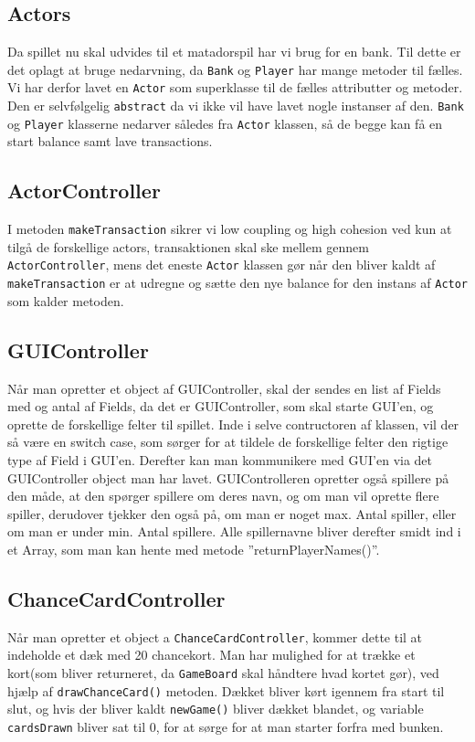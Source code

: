\subsection{Actors}
Da spillet nu skal udvides til et matadorspil har vi brug for en bank. Til dette er det oplagt at bruge nedarvning, da \texttt{Bank} og \texttt{Player} har mange metoder til fælles. Vi har derfor lavet en \texttt{Actor} som superklasse til de fælles attributter og metoder. Den er selvfølgelig \texttt{abstract} da vi ikke vil have lavet nogle instanser af den. \texttt{Bank} og \texttt{Player} klasserne nedarver således fra \texttt{Actor} klassen, så de begge kan få en start balance samt lave transactions.


\subsection{ActorController}
I metoden \texttt{makeTransaction} sikrer vi low coupling og high cohesion ved kun at tilgå de forskellige actors, transaktionen skal ske mellem gennem \texttt{ActorController}, mens det eneste \texttt{Actor} klassen gør når den bliver kaldt af \texttt{makeTransaction} er at udregne og sætte den nye balance for den instans af \texttt{Actor} som kalder metoden.

\subsection{GUIController}
Når man opretter et object af GUIController, skal der sendes en list af Fields med og antal af Fields, da det er GUIController, som skal starte GUI’en, og oprette de forskellige felter til spillet.
Inde i selve contructoren af klassen, vil der så være en switch case, som sørger for at tildele de forskellige felter den rigtige type af Field i GUI’en.
Derefter kan man kommunikere med GUI’en via det GUIController object man har lavet.
GUIControlleren opretter også spillere på den måde, at den spørger spillere om deres navn, og om man vil oprette flere spiller, derudover tjekker den også på, om man er noget max. Antal spiller, eller om man er under min. Antal spillere. Alle spillernavne bliver derefter smidt ind i et Array, som man kan hente med metode ”returnPlayerNames()”. 



\subsection{ChanceCardController}
Når man opretter et object a \texttt{ChanceCardController}, kommer dette til at indeholde et dæk med 20 chancekort. Man har mulighed for at trække et kort(som bliver returneret, da \texttt{GameBoard} skal håndtere hvad kortet gør), ved hjælp af \texttt{drawChanceCard()} metoden. Dækket bliver kørt igennem fra start til slut, og hvis der bliver kaldt \texttt{newGame()} bliver dækket blandet, og variable \texttt{cardsDrawn} bliver sat til 0, for at sørge for at man starter forfra med bunken.

